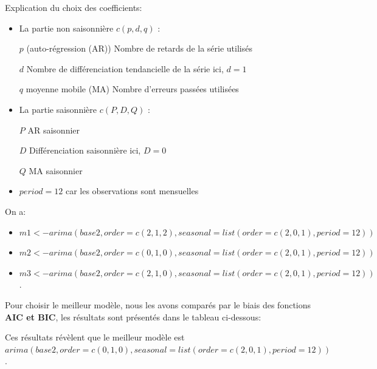 \documentclass[
12pt,          %
a4paper,       %
oneside,       %
openright      %
]{report}
\begin{document}
 Explication du choix des coefficients: 
 
 \begin{itemize}
 	
 	\item La partie non saisonnière $c(p,d,q)$ : 
 	
 	$p$ (auto-régression (AR)) Nombre de retards de la série utilisés
 	
 	$d$ Nombre de différenciation tendancielle de la série ici, $d=1$
 	
 	$q$ moyenne mobile (MA) Nombre d’erreurs passées utilisées
 	
 	\item La partie saisonnière $c(P,D,Q)$ :
 	
 	$P$ AR saisonnier
 	
 	$D$ Différenciation saisonnière ici, $D=0$
 	
 	$Q$ MA saisonnier
 	
 	\item $period = 12$ car les observations sont mensuelles
 	
 \end{itemize}
 
 
 On a: 
 
 \begin{itemize}
 	
 	\item  \textbf{$m1 <- arima(base2, order = c(2,1,2), seasonal = list(order = c(2,0,1), period = 12))$}
 	
 	
 	\item \textbf{$m2 <- arima(base2, order = c(0,1,0), seasonal = list(order = c(2,0,1), period = 12))$}
 	
 	
 	\item \textbf{$m3 <- arima(base2, order = c(2,1,0), seasonal = list(order = c(2,0,1), period = 12))$}.
 	
 \end{itemize}
 
 
 Pour choisir le meilleur modèle, nous les avons comparés par le biais des fonctions \textbf{AIC et BIC}, les résultats sont présentés dans le tableau ci-dessous: 
 
  \begin{table}[H]
  	\centering
  	
  	\caption{Comparaison des modèles ARIMA candidats (AIC / BIC)}
  	\label{tab:selection_arima }
  \end{table}
  
  Ces résultats révèlent que le meilleur modèle est \textbf{$arima(base2, order = c(0,1,0), seasonal = list(order = c(2,0,1), period = 12))$}. 
  
\end{document}
